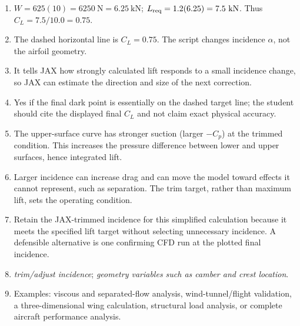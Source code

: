\documentclass[11pt]{article}
\begin{document}
\begin{enumerate}
\item[1.] $W=625(10)=6250\ \mathrm{N}=6.25\ \mathrm{kN}$; $L_{\rm req}=1.2(6.25)=7.5\ \mathrm{kN}$. Thus $C_L=7.5/10.0=0.75$.
\item[2.] The dashed horizontal line is $C_L=0.75$. The script changes incidence $\alpha$, not the airfoil geometry.
\item[3.] It tells JAX how strongly calculated lift responds to a small incidence change, so JAX can estimate the direction and size of the next correction.
\item[4.] Yes if the final dark point is essentially on the dashed target line; the student should cite the displayed final $C_L$ and not claim exact physical accuracy.
\item[5.] The upper-surface curve has stronger suction (larger $-C_p$) at the trimmed condition. This increases the pressure difference between lower and upper surfaces, hence integrated lift.
\item[6.] Larger incidence can increase drag and can move the model toward effects it cannot represent, such as separation. The trim target, rather than maximum lift, sets the operating condition.
\item[7.] Retain the JAX-trimmed incidence for this simplified calculation because it meets the specified lift target without selecting unnecessary incidence. A defensible alternative is one confirming CFD run at the plotted final incidence.
\item[8.] \emph{trim/adjust incidence}; \emph{geometry variables such as camber and crest location}.
\item[9.] Examples: viscous and separated-flow analysis, wind-tunnel/flight validation, a three-dimensional wing calculation, structural load analysis, or complete aircraft performance analysis.
\end{enumerate}
\end{document}
